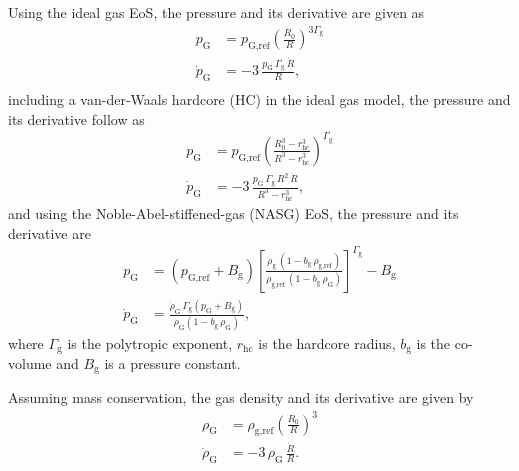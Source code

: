 Using the ideal gas EoS, the pressure and its derivative are given as
\begin{align}
  p_\text{G} &= p_\text{G,ref} \left(\frac{R_0}{R}\right)^{3 \Gamma_\text{g}}\\
  \dot{p}_\text{G} &= -3 \, \frac{p_\text{G} \, \Gamma_\text{g} \, \dot{R}}{R},\\
\end{align}
including a van-der-Waals hardcore (HC) in the ideal gas model, the pressure and its derivative follow as
\begin{align}
  p_\text{G} &= p_\text{G,ref} \left(\frac{R_0^3-r_\text{hc}^3}{R^3-r_\text{hc}^3}\right)^{\Gamma_\text{g}}\\
  \dot{p}_\text{G} &= -3 \, \frac{p_\text{G} \, \Gamma_\text{g} \, R^2 \, \dot{R}}{R^3-r_\text{hc}^3},
\end{align}
and using the Noble-Abel-stiffened-gas (NASG) EoS, the pressure and its derivative are \citep{Denner2021}
\begin{align}
  p_\text{G} &= (p_\text{G,ref} + B_\text{g}) \left[\frac{\rho_\text{g} \, (1-b_\text{g} \, \rho_\text{g,ref})}{\rho_\text{g,ref} \, (1- b_\text{g} \, \rho_\text{G})} \right]^{\Gamma_\text{g}} - B_\text{g}\\
  \dot{p}_\text{G} &= \frac{\dot{\rho}_\text{G} \, \Gamma_\text{g} \left(p_\text{G} + B_\text{g} \right)}{\rho_\text{G} \left(1- b_\text{g} \, \rho_\text{G} \right)},
\end{align}
where $\Gamma_\mathrm{g}$ is the polytropic exponent, $r_\mathrm{hc}$ is the hardcore radius, $b_\mathrm{g}$ is the co-volume and $B_\mathrm{g}$ is a pressure constant.

Assuming mass conservation, the gas density and its derivative are given by 
\begin{align}
  \rho_\text{G} &= \rho_\text{g,ref} \left(\frac{R_0}{R}\right)^3 \label{eq:rhoG}\\
  \dot{\rho}_\text{G} &= -3 \, \rho_\text{G}\, \frac{\dot{R}}{R}. \label{eq:dot_rhoG}
\end{align}

